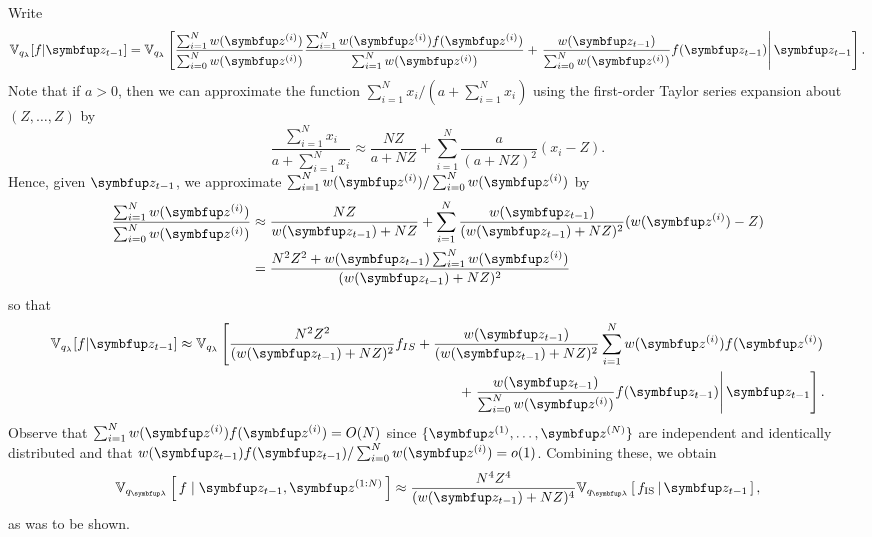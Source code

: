 \begin{proofEnd}
  Write
  \begin{align}
  \mathbb{V}_{q_\lambda}[f|\vz_{t-1}] = \mathbb{V}_{q_\lambda}\left[\frac{\sum_{i=1}^N w(\vz^{(i)})}{\sum_{i=0}^N w(\vz^{(i)})} \frac{\sum_{i=1}^N w(\vz^{(i)})f(\vz^{(i)})}{\sum_{i=1}^N w(\vz^{(i)})} + \left.\frac{w(\vz_{t-1})}{\sum_{i=0}^N w(\vz^{(i)})} f(\vz_{t-1})  \right\vert \vz_{t-1} \right].
  \end{align}
  Note that if $a>0$, then we can approximate the function $\sum_{i=1}^N x_i/(a+\sum_{i=1}^N x_i)$ using the first-order Taylor series expansion about $(Z,\dots,Z)$ by
  $$
  \frac{\sum_{i=1}^N x_i}{a+\sum_{i=1}^N x_i} \approx \frac{NZ}{a+NZ}+\sum_{i=1}^N \frac{a}{(a+NZ)^2} (x_i -Z).
  $$
  Hence, given $\vz_{t-1}$, we approximate $\sum_{i=1}^N w(\vz^{(i)})/\sum_{i=0}^N w(\vz^{(i)})$ by
  \begin{align}
  \frac{\sum_{i=1}^N w(\vz^{(i)})}{\sum_{i=0}^N w(\vz^{(i)})} &\approx \frac{NZ}{w(\vz_{t-1})+NZ} + \sum_{i=1}^N \frac{w(\vz_{t-1})}{(w(\vz_{t-1})+ NZ)^2} (w(\vz^{(i)})-Z) \\
    & = \frac{N^2 Z^2 + w(\vz_{t-1}) \sum_{i=1}^N w(\vz^{(i)})}{(w(\vz_{t-1})+NZ)^2}
  \end{align}
  so that
  \begin{align}
  \mathbb{V}_{q_\lambda}[f|\vz_{t-1}] \approx \mathbb{V}_{q_\lambda} \left[\frac{N^2Z^2}{(w(\vz_{t-1})+NZ)^2} f_{IS} + \frac{w(\vz_{t-1})}{(w(\vz_{t-1})+NZ)^2}\sum_{i=1}^N w(\vz^{(i)})f(\vz^{(i)})\right. \\ \left.
  + \left. \frac{w(\vz_{t-1})}{\sum_{i=0}^N w(\vz^{(i)})} f(\vz_{t-1}) \right\vert \vz_{t-1} \right].
  \end{align}
  Observe that $\sum_{i=1}^N w(\vz^{(i)}) f(\vz^{(i)}) = O(N)$ since $\{\vz^{(1)}, \dots, \vz^{(N)}\}$ are independent and identically distributed and that $w(\vz_{t-1})f(\vz_{t-1})/\sum_{i=0}^N w(\vz^{(i)})=o(1)$.
  Combining these, we obtain
  \begin{align}
    \Vsub{q_{\vlambda}}{  f \mid \vz_{t-1}, \vz^{(1:N)} } \approx \frac{N^4 Z^4}{(w(\vz_{t-1}) + NZ)^4} \Vsub{q_{\vlambda}}{ f_{\text{IS}} \,\middle\vert\, \vz_{t-1} },
  \end{align}
  as was to be shown.
\end{proofEnd}

